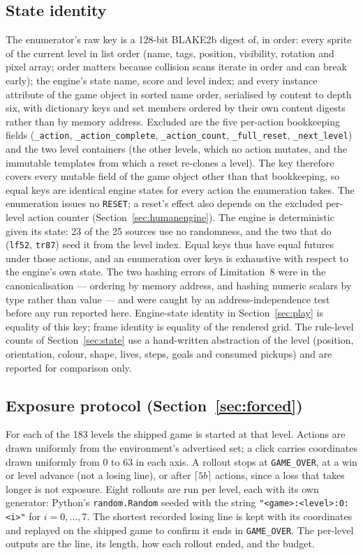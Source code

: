 \documentclass[11pt]{article}
\newcommand{\code}[1]{\texttt{#1}}
\begin{document}
\subsection{State identity}
\label{app:key}

The enumerator's raw key is a 128-bit BLAKE2b digest of, in order: every sprite
of the current level in list order (name, tags, position, visibility, rotation
and pixel array; order matters because collision scans iterate in order and can
break early); the engine's state name, score and level index; and every
instance attribute of the game object in sorted name order, serialised by
content to depth six, with dictionary keys and set members ordered by their own
content digests rather than by memory address. Excluded are the five per-action
bookkeeping fields (\code{\_action}, \code{\_action\_complete},
\code{\_action\_count}, \code{\_full\_reset}, \code{\_next\_level}) and the two
level containers (the other levels, which no action mutates, and the immutable
templates from which a reset re-clones a level). The key therefore covers every
mutable field of the game object other than that bookkeeping, so equal keys are
identical engine states for every action the enumeration takes. The enumeration
issues no \code{RESET}; a reset's effect also depends on the excluded per-level
action counter (Section~\ref{sec:humanengine}).
The engine is deterministic given its state: 23 of the 25 sources use no
randomness, and the two that do (\code{lf52}, \code{tr87}) seed it from the
level index. Equal keys thus have equal futures under those actions, and an enumeration over keys is
exhaustive with respect to the engine's own state. The two hashing errors of
Limitation~8 were in the canonicalisation --- ordering by memory address, and
hashing numeric scalars by type rather than value --- and were caught by an
address-independence test before any run reported here. Engine-state identity
in Section~\ref{sec:play} is equality of this key; frame identity is equality
of the rendered grid. The rule-level counts of Section~\ref{sec:state} use a
hand-written abstraction of the level (position, orientation, colour, shape,
lives, steps, goals and consumed pickups) and are reported for comparison only.

\subsection{Exposure protocol (Section~\ref{sec:forced})}

For each of the 183 levels the shipped game is started at that level. Actions
are drawn uniformly from the environment's advertised set; a click carries
coordinates drawn uniformly from $0$ to $63$ in each axis. A rollout stops at
\code{GAME\_OVER}, at a win or level advance (not a losing line), or after
$\lceil 5b \rceil$ actions, since a loss that takes longer is not exposure.
Eight rollouts are run per level, each with its own generator:
Python's \code{random.Random} seeded with the string \code{"<game>:<level>:0:<i>"} for
$i=0,\dots,7$. The shortest recorded losing line is kept with its coordinates
and replayed on the shipped game to confirm it ends in \code{GAME\_OVER}. The
per-level outputs are the line, its length, how each rollout ended, and the
budget.
\end{document}
